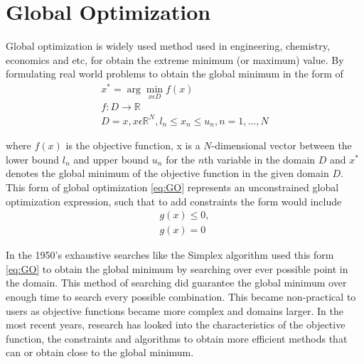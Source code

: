 \chapter{Global Optimization}
\label{background}
Global optimization is widely used method used in engineering, chemistry, economics and etc, for obtain the extreme minimum (or maximum) value. By formulating real world problems to obtain the global minimum in the form of
\begin{align}
  \label{eq:GO}
  x^* = \arg \min_{x \epsilon D} f(x)\\
  f:D\rightarrow \mathbb{R} \\ 
  D = {x,x\epsilon \mathbb{R}^{N},l_n\leq x_n \leq u_n, n = 1,\ldots,N}
\end{align}

where $f(x)$ is the objective function, x is a $N$-dimensional vector between the lower bound $l_n$ and upper bound $u_n$ for the $n$th variable in the domain $D$ and $x^*$ denotes the global minimum of the objective function in the given domain $D$. This form of global optimization \ref{eq:GO} represents an unconstrained global optimization expression, such that to add constraints the form would include 
\begin{align}
  \label{eq:constrainedGO}
    g(x) \leq 0, \\
    g(x) = 0
\end{align}

In the 1950's exhaustive searches like the Simplex algorithm \cite{Liberti2000} used this form \ref{eq:GO} to obtain the global minimum by searching over ever possible point in the domain. This method of searching did guarantee the global minimum over enough time to search every possible combination. This became non-practical to users as objective functions became more complex and domains larger. In the most recent years, research has looked into the characteristics of the
objective function, the constraints and algorithms to obtain more efficient methods that can or obtain close to the global minimum. 

